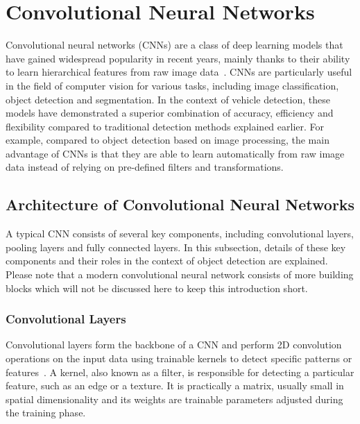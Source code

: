 
\section{Convolutional Neural Networks}
\label{CNNs}


Convolutional neural networks (CNNs) are a class of deep learning models that
have gained widespread popularity in recent years, mainly thanks to their
ability to learn hierarchical features from raw image data~\cite{Li2022}. CNNs
are particularly useful in the field of computer vision for various tasks,
including image classification, object detection and segmentation. In the
context of vehicle detection, these models have demonstrated a superior
combination of accuracy, efficiency and flexibility compared to traditional
detection methods explained earlier. For example, compared to object detection
based on image processing, the main advantage of CNNs is that they are able to
learn automatically from raw image data instead of relying on pre-defined
filters and transformations.


\subsection{Architecture of Convolutional Neural Networks}

A typical CNN consists of several key components, including convolutional
layers, pooling layers and fully connected layers. In this subsection, details
of these key components and their roles in the context of object detection are
explained. Please note that a modern convolutional neural network consists of
more building blocks which will not be discussed here to keep this introduction
short.

\subsubsection{Convolutional Layers}

Convolutional layers form the backbone of a CNN and perform 2D convolution
operations on the input data using trainable kernels to detect specific patterns
or features~\cite{OShea2015}. A kernel, also known as a filter, is responsible for detecting a
particular feature, such as an edge or a texture. It is practically a matrix,
usually small in spatial dimensionality and its weights are trainable parameters
adjusted during the training phase.

